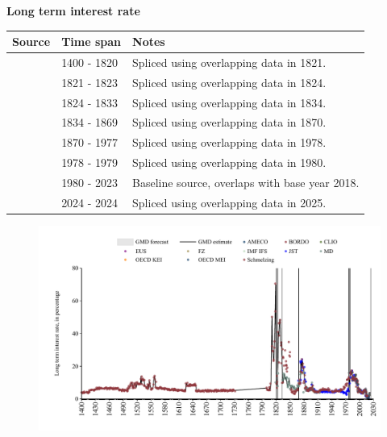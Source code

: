 \documentclass[12pt,a4paper,landscape]{article}
\begin{document}
\begin{adjustbox}{max totalsize={\paperwidth}{\paperheight},center}
\begin{minipage}[t][\textheight][t]{\textwidth}
\vspace*{0.5cm}
{}
\begin{center}
{\Large\bfseries Long term interest rate}
\end{center}
\vspace{0.5cm}
\begin{table}[H]
\centering
\small
\begin{tabular}{|l|l|l|}
\hline
\textbf{Source} & \textbf{Time span} & \textbf{Notes} \\
\hline
\rowcolor{white}\cite{Schmelzing}& 1400 - 1820 &Spliced using overlapping data in 1821. \\
\rowcolor{lightgray}\cite{MD}& 1821 - 1823 &Spliced using overlapping data in 1824. \\
\rowcolor{white}\cite{Schmelzing}& 1824 - 1833 &Spliced using overlapping data in 1834. \\
\rowcolor{lightgray}\cite{MD}& 1834 - 1869 &Spliced using overlapping data in 1870. \\
\rowcolor{white}\cite{JST}& 1870 - 1977 &Spliced using overlapping data in 1978. \\
\rowcolor{lightgray}\cite{EUS}& 1978 - 1979 &Spliced using overlapping data in 1980. \\
\rowcolor{white}\cite{OECD_MEI}& 1980 - 2023 &Baseline source, overlaps with base year 2018. \\
\rowcolor{lightgray}\cite{EUS}& 2024 - 2024 &Spliced using overlapping data in 2025. \\
\hline
\end{tabular}
\end{table}
\begin{figure}[H]
\centering
\includegraphics[width=\textwidth,height=0.6\textheight,keepaspectratio]{graphs/ESP_ltrate.pdf}
\end{figure}
\end{minipage}
\end{adjustbox}
\end{document}
